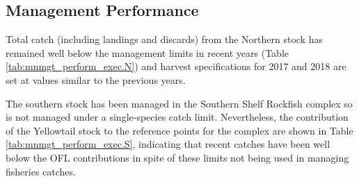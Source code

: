 \documentclass[12pt,]{article}
\begin{document}
\FloatBarrier

\subsection*{Management Performance}\label{management-performance}

Total catch (including landings and discards) from the Northern stock
has remained well below the management limits in recent years (Table
\ref{tab:mnmgt_perform_exec.N}) and harvest specifications for 2017 and
2018 are set at values similar to the previous years.

The southern stock has been managed in the Southern Shelf Rockfish
complex so is not managed under a single-species catch limit.
Nevertheless, the contribution of the Yellowtail stock to the reference
points for the complex are shown in Table
\ref{tab:mnmgt_perform_exec.S}, indicating that recent catches have been
well below the OFL contributions in spite of these limits not being used
in managing fisheries catches.

\begin{table}[ht]
\centering
\caption{Northern model recent total catch
                              relative to the management guidelines. 
                              Estimated total catch includes estimated discarded
                              biomass. Note: the OFL was termed the ABC prior to
                              implementation of FMP Amendment 23 in 2011.
                              The ABC was redefined to reflect the uncertainty
                              in estimating the OFL under Amendment 23.
                              Likewise, the ACL was termed the OY prior to 2011.} 
\label{tab:mnmgt_perform_exec.N}
\end{table}
\end{document}
